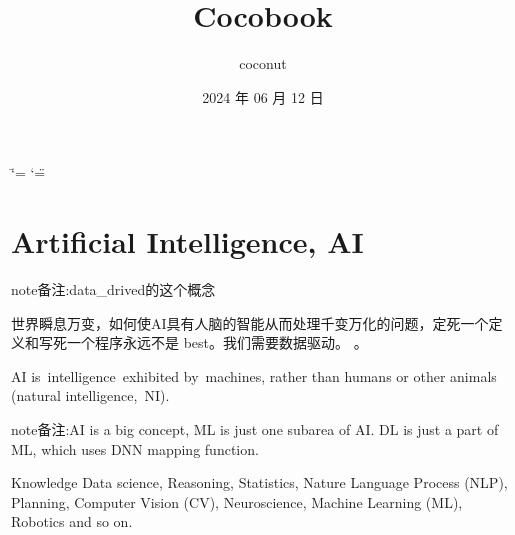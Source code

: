 \documentclass[letterpaper,10pt,english]{sphinxmanual}
\title{Cocobook}
\date{2024 年 06 月 12 日}
\author{coconut}
\begin{document}
\ifdefined\shorthandoff
  \ifnum\catcode`\=\string=\active\shorthandoff{=}\fi
  \ifnum\catcode`\"=\active{}\fi
\fi

\pagestyle{empty}
\sphinxmaketitle
\pagestyle{plain}
\sphinxtableofcontents
\pagestyle{normal}
\label{\detokenize{index::doc}}


\sphinxstepscope


\chapter{Artificial Intelligence, AI}
\label{\detokenize{AI/main:artificial-intelligence-ai}}\label{\detokenize{AI/main::doc}}
\begin{sphinxadmonition}{note}{备注:}{data\_drived的这个概念}

\sphinxAtStartPar
世界瞬息万变，如何使AI具有人脑的智能从而处理千变万化的问题，定死一个定义和写死一个程序永远不是 best。我们需要数据驱动。 。
\end{sphinxadmonition}

\sphinxAtStartPar
AI is intelligence exhibited by machines, rather than humans or other animals (natural intelligence, NI).

\begin{sphinxadmonition}{note}{备注:}{AI is a big concept, ML is just one subarea of AI. DL is just a part of ML, which uses DNN mapping function.}
\end{sphinxadmonition}

\noindent{}

\begin{DUlineblock}{0em}
\item[] 
\item[] Knowledge Data science, Reasoning, Statistics, Nature Language Process (NLP), Planning, Computer Vision (CV), Neuroscience, Machine Learning (ML), Robotics and so on.
\end{DUlineblock}

\sphinxAtStartPar
{}

\noindent{}
\end{document}
